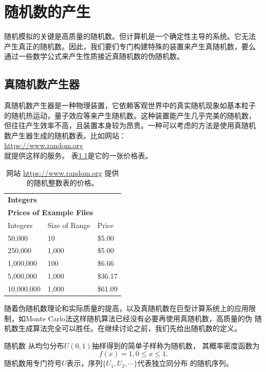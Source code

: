 \chapter{随机数的产生}

随机模拟的关键是高质量的随机数。但计算机是一个确定性主导的系统。它无法
产生真正的随机数。因此，我们要们专门构建特殊的装置来产生真随机数，要么
通过一些数学公式来产生性质接近真随机数的伪随机数\cite{Kang2015MonteCarlo}。

\section{真随机数产生器}

真随机数产生器是一种物理装置，它依赖客观世界中的真实随机现象如基本粒子
的随机热运动，量子效应等来产生随机数。这种装置能产生几乎完美的随机数，
但往往产生效率不高，且装置本身较为昂贵。一种可以考虑的方法是使用真随机
数产生器生成的随机数表。比如网站：\\
\href{https://www.random.org}{https://www.random.org} \\
就提供这样的服务。
表\ref{table::random_org}是它的一张价格表。

\begin{table}
  \centering
  \begin{tabular}[!ht]{lll}
    \multicolumn{3}{l}{\bf Integers}\\
    \multicolumn{3}{l}{\bf Prices of Example Files}\\
    \hline
    \hline
Integers & Size of Range  & Price \\
\hline
50,000	& 10	& \$5.00 \\
\hline
250,000	& 1,000	& \$5.00 \\
\hline
1,000,000 & 100	& \$6.66 \\
\hline
5,000,000 & 1,000 & \$36.17 \\
\hline
10,000,000 & 1,000 & \$61.09\\
\hline
\end{tabular}
  \caption{网站 \href{https://www.random.org}{https://www.random.org}
    提供的随机整数表的价格。}
  \label{table::random_org}
\end{table}

随着伪随机数理论和实际质量的提高，以及真随机数在巨型计算系统上的应用限
制，如Monte Carlo法这样随机算法已经没有必要再使用真随机数，高质量的伪
随机数生成算法完全可以胜任。在继续讨论之前，我们先给出随机数的定义。

\begin{definition} {\hei 随机数} 从均匀分布$U(0, 1)$抽样得到的简单子样称为随机数，
  其概率密度函数为
  $$
  f(x) = 1, 0 \leq x \leq 1.
  $$
  随机数用专门符号$U$表示，序列$\{U_1, U_2, \cdots\}$代表独立同分布
  的随机序列。
  \label{def::psudo_random_number}
\end{definition}

